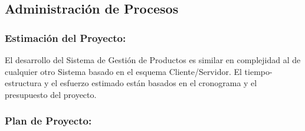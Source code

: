 \documentclass[a4paper,11pt, spanish]{report}
\begin{document}
{{{{{{{{    \subsection{Administración de Procesos}
        \subsubsection{Estimación del Proyecto:}
            El desarrollo del Sistema de Gestión de Productos es similar en complejidad al de cualquier otro Sistema basado en el esquema Cliente/Servidor. El tiempo-estructura y el esfuerzo estimado están basados en el cronograma y el presupuesto del proyecto.
        \subsubsection{Plan de Proyecto:}

}}}}}}}}
\end{document}
